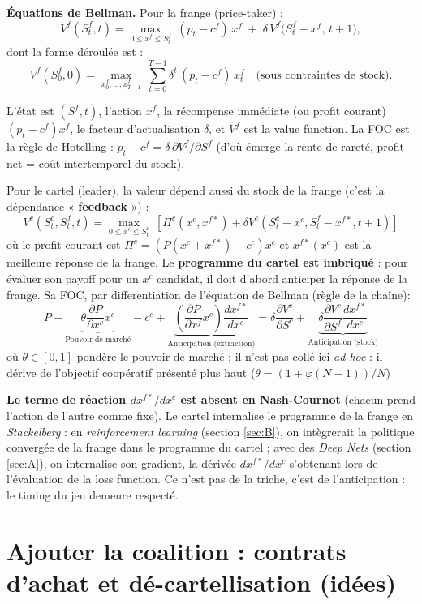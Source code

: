 \documentclass[11pt]{article}
\begin{document}
\textbf{Équations de Bellman.} Pour la frange (price-taker) :
$$V^f(S^f_t,t)=\max_{0\le x^f\le S^f_t}\ (p_t-c^f)\,x^f\;+\;\delta\,V^f\!\big(S^f_t-x^f,\,t+1\big),$$
dont la forme déroulée est :
$$V^f(S^f_0,0)=\max_{x^f_0,\dots,x^f_{T-1}}\ \sum_{t=0}^{T-1}\delta^t\,(p_t-c^f)\,x^f_t\quad\text{(sous contraintes de stock).}$$

L'état est $(S^f,t)$, l'action $x^f$, la récompense immédiate (ou profit courant)
$(p_t-c^f)x^f$, le facteur d'actualisation $\delta$, et $V^f$ est la value function. La
FOC est la règle de Hotelling : $p_t-c^f = \delta\,\partial V^f/\partial S^f$
(d'où émerge la rente de rareté, profit net = coût intertemporel du stock).

Pour le cartel (leader), la valeur dépend aussi du stock de la frange (c'est la dépendance « \textbf{feedback} ») :$$V^c(S^c_t,S^f_t,t)=\max_{0\le x^c\le S^c_t}\ \left[ \Pi^c(x^c, x^{f*}) + \delta V^c(S^c_t-x^c, S^f_t-x^{f*}, t+1) \right]$$où le profit courant est $\Pi^c = (P(x^c+x^{f*})-c^c)x^c$ et $x^{f*}(x^c)$ est la meilleure réponse de la frange.  
Le \textbf{programme du cartel est imbriqué} :
pour évaluer son payoff pour un $x^c$ candidat, il doit d'abord anticiper la réponse de la frange. Sa
FOC, par differentiation de l'équation de Bellman (règle de la chaîne): $$P + \underbrace{\theta \frac{\partial P}{\partial x^c} x^c}_{\text{Pouvoir de marché}} - c^c + \underbrace{\left( \frac{\partial P}{\partial x^f} x^c \right) \frac{dx^{f*}}{dx^c}}_{\text{Anticipation (extraction)}} = \delta \frac{\partial V^c}{\partial S^c} + \underbrace{\delta \frac{\partial V^c}{\partial S^f}\frac{dx^{f*}}{dx^c}}_{\text{Anticipation (stock)}}$$
où $\theta \in [0,1]$ pondère le pouvoir de marché ; il n'est pas collé ici \emph{ad hoc} : il dérive de l'objectif coopératif présenté plus haut ($\theta=(1+\varphi(N-1))/N$)



\textbf{Le terme de réaction $dx^{f\ast}/dx^c$ est absent en Nash-Cournot} (chacun prend l'action de l'autre comme fixe). Le cartel internalise le programme de la frange en \emph{Stackelberg} : en \emph{reinforcement learning} (section \ref{sec:B}), on intègrerait la politique convergée de la frange dans le programme du cartel ; avec des \emph{Deep Nets} (section \ref{sec:A}), on internalise son gradient, la dérivée $dx^{f\ast}/dx^c$ s'obtenant lors de l'évaluation de la loss function. Ce n'est pas de la triche, c'est de l'anticipation : le timing du jeu demeure respecté.



\section{Ajouter la coalition : contrats d'achat et dé-cartellisation (idées)}
\end{document}
